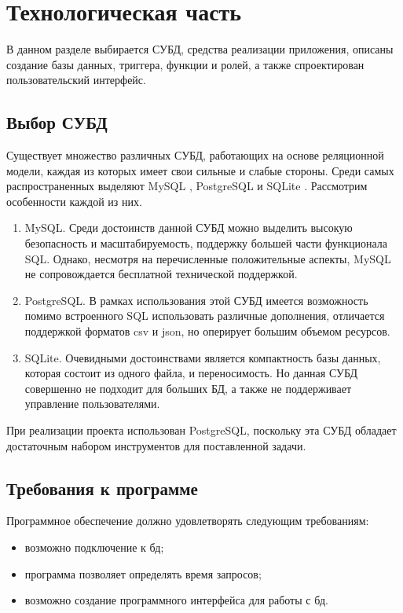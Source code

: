 \section{Технологическая часть}

В данном разделе выбирается СУБД, средства реализации приложения,
описаны создание базы данных, триггера, функции и ролей,
а также спроектирован пользовательский интерфейс.

\subsection{Выбор СУБД}

Существует множество различных СУБД, работающих на основе реляционной модели,
каждая из которых имеет свои сильные и слабые стороны.
Среди самых распространенных \cite{most_popular} выделяют MySQL \cite{mysql},
PostgreSQL \cite{postgresql} и SQLite \cite{sqlite}.
Рассмотрим особенности каждой из них.

\begin{enumerate}
    \item MySQL. Среди достоинств данной СУБД можно выделить высокую
          безопасность и масштабируемость,
          поддержку большей части функционала SQL. Однако, несмотря на
          перечисленные
          положительные аспекты,
          MySQL не сопровождается бесплатной технической поддержкой.
    \item PostgreSQL. В рамках использования этой СУБД имеется возможность
          помимо встроенного SQL использовать различные дополнения,
          отличается поддержкой форматов csv и json, но оперирует большим
          объемом
          ресурсов.
    \item SQLite. Очевидными достоинствами является компактность базы
          данных, которая состоит из одного файла,
          и переносимость.
          Но данная СУБД совершенно не подходит для больших БД, а также не
          поддерживает управление пользователями.
\end{enumerate}

При реализации проекта использован PostgreSQL,
поскольку эта СУБД обладает достаточным набором инструментов для поставленной
задачи.
\subsection{Требования к программе}

Программное обеспечение должно удовлетворять следующим требованиям:
\begin{itemize}
    \item возможно подключение к бд;
    \item программа позволяет определять время запросов;
    \item возможно создание программного интерфейса для работы с бд.
\end{itemize}

